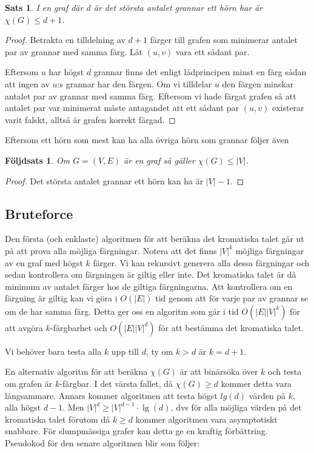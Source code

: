 \documentclass[a4paper]{report}
\newtheorem{theorem}{Sats}
\newtheorem{corollary}{Följdsats}
\begin{document}
\begin{theorem}
    I en graf där $d$ är det största antalet grannar ett hörn har är $\chi(G) \le d + 1$.
\end{theorem}

\begin{proof}
    Betrakta en tilldelning av $d+1$ färger till grafen som minimerar antalet par av grannar med samma färg. Låt $(u, v)$ vara ett sådant par.

    Eftersom $u$ har högst $d$ grannar finns det enligt lådprincipen minst en färg sådan att ingen av $u$:s grannar har den färgen. Om vi tilldelar
    $u$ den färgen minskar antalet par av grannar med samma färg. Eftersom vi hade färgat grafen så att antalet par var minimerat måste
    antagandet att ett sådant par $(u, v)$ existerar varit falskt, alltså är grafen korrekt färgad.
\end{proof}

Eftersom ett hörn som mest kan ha alla övriga hörn som grannar följer även

\begin{corollary}
    Om $G = (V, E)$ är en graf så gäller $\chi(G)\le|V|$.
\end{corollary}
\begin{proof}
    Det största antalet grannar ett hörn kan ha är $|V| - 1$.
\end{proof}

\subsection{Bruteforce}
Den första (och enklaste) algoritmen för att beräkna det kromatiska talet går ut på att prova alla möjliga färgningar. Notera att det finns $|V|^k$ möjliga färgningar av en graf med högst $k$ färger. Vi kan rekursivt generera alla dessa färgningar och sedan kontrollera om färgningen är giltig eller inte. Det kromatiska talet är då minimum av antalet färger hos de giltiga färgningarna. Att kontrollera om en färgning är giltig kan vi göra i $O(|E|)$ tid genom att för varje par av grannar se om de har samma färg. Detta ger oss en algoritm som går i tid $O(|E||V|^k)$ för att avgöra $k$-färgbarhet och $O(|E||V|^{d})$ för att bestämma det kromatiska talet.

Vi behöver bara testa alla $k$ upp till $d$, ty om $k > d$ är $k = d + 1$.

En alternativ algoritm för att beräkna $\chi(G)$ är att binärsöka över $k$ och testa om grafen är $k$-färgbar. I det värsta fallet, då $\chi(G) \ge d$ kommer detta vara långsammare.
Annars kommer algoritmen att testa högst $lg (d)$ värden på $k$, alla högst $d-1$. Men $|V|^{d} \ge |V|^{d-1}\cdot{\lg(d)}$, dvs för alla möjliga värden på
det kromatiska talet förutom då $k \ge d$ kommer algoritmen vara asymptotiskt snabbare. För slumpmässiga grafer kan detta ge en kraftig förbättring. Pseudokod
för den senare algoritmen blir som följer:
\end{document}

